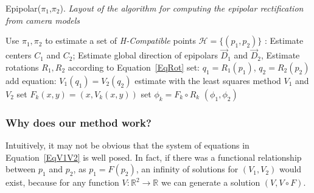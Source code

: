 \documentclass{ipol}
\newcommand{\RR}{\ensuremath{\mathbb{R}}}
\begin{document}
\begin{algorithm}[H]
\caption{Epipolar($\pi_1$,$\pi_2$). \emph{Layout of the algorithm for computing the epipolar rectification from camera models}}
\begin{algorithmic}
    \STATE Use $\pi_1,\pi_2$ to estimate a set of \emph{H-Compatible} points $\mathcal{H} =\{(p_1,p_2)\}$ : 
    \STATE Estimate centers $C_1$ and $C_2$;
    \STATE Estimate global direction of epipolars $\vec{D}_1$ and $\vec{D}_2$,
    \STATE Estimate rotations $R_1,R_2$ according to Equation~\eqref{EqRot}
              \STATE set: $q_1 = R_1(p_1)$,  $q_2 = R_2(p_2)$
              \STATE add equation: $V_1(q_1) = V_2(q_2)$
    \ENDFOR
    \STATE estimate with the least squares method $V_1$ and $V_2$
    \STATE set $F_k(x,y)=(x,V_k(x,y))$  %
    \STATE set $\phi_k =  F_k \circ  R_k $ %
    \RETURN $(\phi_1,\phi_2)$
\end{algorithmic}
\label{AlgoGlob}
\end{algorithm}



\subsubsection{Why does our method work?}
\label{WhyWork}

Intuitively, it may not be  obvious that the system of equations in Equation~\eqref{EqV1V2} is well posed.
In fact, if there was a functional relationship between
$p_1$ and $p_2$, as $p_1=F(p_2)$,  an infinity of solutions
for $(V_1,V_2)$ would exist, because   for any function $V: \RR^2 \rightarrow \RR $ we can generate a solution $(V,V\circ F)$.
\end{document}

